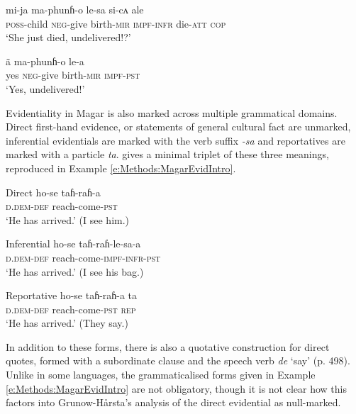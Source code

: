 \begin{exe}
  \ex \label{e:Methods:MagarMirativeAddOri}
  \begin{xlist}
    \ex \label{e:Methods:MagarMirativeAddOri:q}
    \gll mi-ja ma-phunɦ-o le-sa si-cʌ ale \\
    \textsc{poss}-child \textsc{neg}-{give birth}-\textsc{mir} \textsc{impf-infr} die-\textsc{att} \textsc{cop} \\
    \glt `She just died, undelivered!?'

    \ex \label{e:Methods:MagarMirativeAddOri:a}
    \gll ã ma-phunɦ-o le-a \\
    yes \textsc{neg}-{give birth}-\textsc{mir} \textsc{impf-pst} \\
    \glt `Yes, undelivered!'
  \end{xlist}
  \cite[Magar,][487]{GrunowHarsta2008}
\end{exe}

Evidentiality in Magar is also marked across multiple grammatical domains. Direct first-hand evidence, or statements of general cultural fact are unmarked, inferential evidentials are marked with the verb suffix \textit{-sa} and reportatives are marked with a particle \textit{ta}.  gives a minimal triplet of these three meanings, reproduced in Example \ref{e:Methods:MagarEvidIntro}.

\begin{exe}
  \ex \label{e:Methods:MagarEvidIntro}
  \begin{xlist}
    \ex Direct
    \gll ho-se taɦ-raɦ-a \\
    \textsc{d.dem-def} reach-come-\textsc{pst} \\
    \glt `He has arrived.' (I see him.)

    \ex Inferential
    \gll ho-se taɦ-raɦ-le-sa-a \\
    \textsc{d.dem-def} reach-come-\textsc{impf-infr-pst} \\
    \glt `He has arrived.' (I see his bag.)

    \ex Reportative
    \gll ho-se taɦ-raɦ-a ta \\
    \textsc{d.dem-def} reach-come-\textsc{pst} \textsc{rep} \\
    \glt `He has arrived.' (They say.)
  \end{xlist}
  \cite[Magar,][497]{GrunowHarsta2008}
\end{exe}

In addition to these forms, there is also a quotative construction for direct quotes, formed with a subordinate clause and the speech verb \textit{de} `say' (p. 498). Unlike in some languages, the grammaticalised forms given in Example \ref{e:Methods:MagarEvidIntro} are not obligatory, though it is not clear how this factors into Grunow-Hårsta's analysis of the direct evidential as null-marked.

